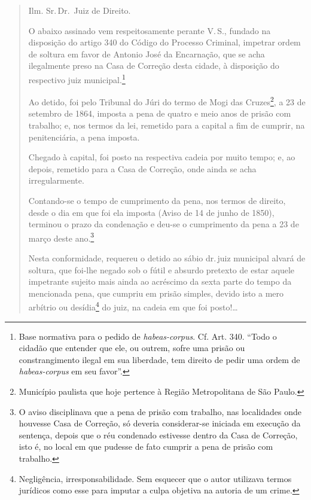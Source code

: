 \begin{quote}
Ilm. Sr.\,Dr.~Juiz de Direito.

O abaixo assinado vem respeitosamente perante V.\,S., fundado na
disposição do artigo 340 do Código do Processo Criminal, impetrar ordem
de soltura em favor de Antonio José da Encarnação, que se acha
ilegalmente preso na Casa de Correção desta cidade, à disposição do
respectivo juiz municipal.\footnote{Base normativa para o pedido de
  \emph{habeas-corpus}. Cf. Art. 340. ``Todo o cidadão que entender que
  ele, ou outrem, sofre uma prisão ou constrangimento ilegal em sua
  liberdade, tem direito de pedir uma ordem de \emph{habeas-corpus} em
  seu favor''.}

Ao detido, foi pelo Tribunal do Júri do termo de Mogi das
Cruzes\footnote{Município paulista que hoje pertence à Região
  Metropolitana de São Paulo.}, a 23 de setembro de 1864, imposta a pena
de quatro e meio anos de prisão com trabalho; e, nos termos da lei,
remetido para a capital a fim de cumprir, na penitenciária, a pena
imposta.

Chegado à capital, foi posto na respectiva cadeia por muito tempo; e, ao
depois, remetido para a Casa de Correção, onde ainda se acha
irregularmente.

Contando-se o tempo de cumprimento da pena, nos termos de direito, desde
o dia em que foi ela imposta (Aviso de 14 de junho de 1850), terminou o
prazo da condenação e deu-se o cumprimento da pena a 23 de março deste
ano.\footnote{O aviso disciplinava que a pena de prisão com trabalho,
  nas localidades onde houvesse Casa de Correção, só deveria
  considerar-se iniciada em execução da sentença, depois que o réu
  condenado estivesse dentro da Casa de Correção, isto é, no local em
  que pudesse de fato cumprir a pena de prisão com trabalho.}

Nesta conformidade, requereu o detido ao sábio dr.\,juiz municipal alvará
de soltura, que foi-lhe negado sob o fútil e absurdo pretexto de estar
aquele impetrante sujeito mais ainda ao acréscimo da sexta parte do
tempo da mencionada pena, que cumpriu em prisão simples, devido isto a
mero arbítrio ou desídia\footnote{Negligência, irresponsabilidade. Sem
  esquecer que o autor utilizava termos jurídicos como esse para imputar
  a culpa objetiva na autoria de um crime.} do juiz, na cadeia em que
foi posto!\ldots{}


\end{quote}
